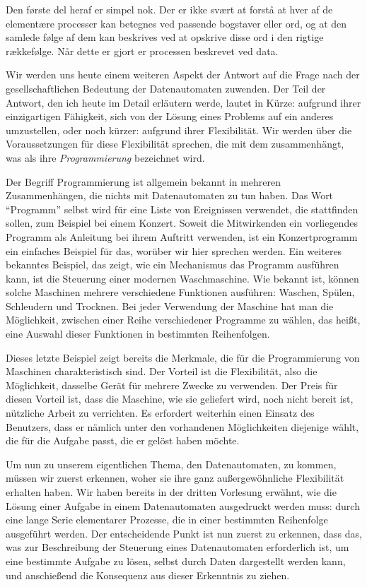 {Den første del heraf er simpel nok. Der er ikke svært at forstå at hver af de elementære processer kan betegnes ved passende bogstaver eller ord, og at den samlede følge af dem kan beskrives ved at opskrive disse ord i den rigtige rækkefølge. Når dette er gjort er processen beskrevet ved data. 
}{
Wir werden uns heute einem weiteren Aspekt der Antwort auf die Frage nach der gesellschaftlichen Bedeutung der Datenautomaten zuwenden. Der Teil der Antwort, den ich heute im Detail erläutern werde, lautet in Kürze: aufgrund ihrer einzigartigen Fähigkeit, sich von der Lösung eines Problems auf ein anderes umzustellen, oder noch kürzer: aufgrund ihrer Flexibilität. Wir werden über die Voraussetzungen für diese Flexibilität sprechen, die mit dem zusammenhängt, was als ihre \emph{Programmierung} bezeichnet wird.

Der Begriff Programmierung ist allgemein bekannt in mehreren Zusammenhängen, die nichts mit Datenautomaten zu tun haben. Das Wort \enquote{Programm} selbst wird für eine Liste von Ereignissen verwendet, die stattfinden sollen, zum Beispiel bei einem Konzert. Soweit die Mitwirkenden ein vorliegendes Programm als Anleitung bei ihrem Auftritt verwenden, ist ein Konzertprogramm ein einfaches Beispiel für das, worüber wir hier sprechen werden. Ein weiteres bekanntes Beispiel, das zeigt, wie ein Mechanismus das Programm ausführen kann, ist die Steuerung einer modernen Waschmaschine. Wie bekannt ist, können solche Maschinen mehrere verschiedene Funktionen ausführen: Waschen, Spülen, Schleudern und Trocknen. Bei jeder Verwendung der Maschine hat man die Möglichkeit, zwischen einer Reihe verschiedener Programme zu wählen, das heißt, eine Auswahl dieser Funktionen in bestimmten Reihenfolgen.

Dieses letzte Beispiel zeigt bereits die Merkmale, die für die Programmierung von Maschinen charakteristisch sind. Der Vorteil ist die Flexibilität, also die Möglichkeit, dasselbe Gerät für mehrere Zwecke zu verwenden. Der Preis für diesen Vorteil ist, dass die Maschine, wie sie geliefert wird, noch nicht bereit ist, nützliche Arbeit zu verrichten. Es erfordert weiterhin einen Einsatz des Benutzers, dass er nämlich unter den vorhandenen Möglichkeiten diejenige wählt, die für die Aufgabe passt, die er gelöst haben möchte.

Um nun zu unserem eigentlichen Thema, den Datenautomaten, zu kommen, müssen wir zuerst erkennen, woher sie ihre ganz außergewöhnliche Flexibilität erhalten haben. Wir haben bereits in der dritten Vorlesung erwähnt, wie die Lösung einer Aufgabe in einem Datenautomaten ausgedruckt werden muss: durch eine lange Serie elementarer Prozesse, die in einer bestimmten Reihenfolge ausgeführt werden. Der entscheidende Punkt ist nun zuerst zu erkennen, dass das, was zur Beschreibung der Steuerung eines Datenautomaten erforderlich ist, um eine bestimmte Aufgabe zu lösen, selbst durch Daten dargestellt werden kann, und anschießend die Konsequenz aus dieser Erkenntnis zu ziehen.

}

